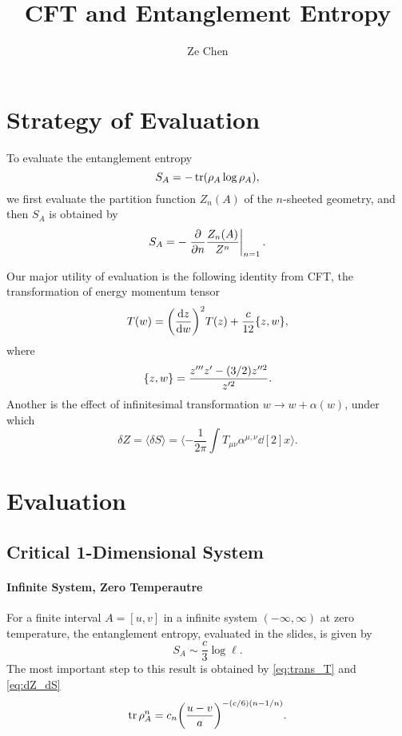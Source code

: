\documentclass{article}
\title{CFT and Entanglement Entropy}
\author{Ze Chen}
\begin{document}
\maketitle

\section{Strategy of Evaluation}

To evaluate the entanglement entropy
\[ S_A = -\tr(\rho_A \log \rho_A), \]
we first evaluate the partition function $Z_n(A)$ of the $n$-sheeted geometry, and then $S_A$ is obtained by
\[ S_A = -\eval{\pdv{n} \frac{Z_n(A)}{Z^n}}_{n=1}. \]

\par
Our major utility of evaluation is the following identity from CFT, the transformation of energy momentum tensor
\begin{equation}
    \label{eq:trans_T}
    T(w) = \qty(\dv{z}{w})^2 T(z) + \frac{c}{12}\qty{z,w},
\end{equation}
where
\[ \qty{z,w} = \frac{z''' z' - (3/2) z''^2}{z'^2}. \]
Another is the effect of infinitesimal transformation $w \rightarrow w+\alpha(w)$, under which
\begin{equation}
    \label{eq:dZ_dS}
    \delta Z = \langle \delta S \rangle = \langle -\frac{1}{2\pi} \int T_{\mu\nu} \alpha^{\mu,\nu} \dd[2]{x} \rangle.
\end{equation}

\section{Evaluation}

\subsection{Critical 1-Dimensional System}
\label{ss:c1ds}

\paragraph*{Infinite System, Zero Temperautre}
For a finite interval $A = [u, v]$ in a infinite system $(-\infty,\infty)$ at zero temperature, the entanglement entropy, evaluated in the slides, is given by
\[ S_A \sim \frac{c}{3} \log \ell. \]
The most important step to this result is obtained by \eqref{eq:trans_T} and \eqref{eq:dZ_dS}
\begin{equation}
    \label{eq:rho_A_n}
    \tr \rho^n_A = c_n \qty(\frac{u - v}{a})^{-(c/6)(n - 1/n)}.
\end{equation}
\end{document}
